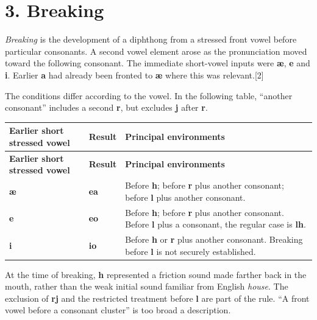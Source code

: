 \section*{3. Breaking}
\emph{Breaking} is the development of a diphthong from a stressed front vowel before particular consonants. A second vowel element arose as the pronunciation moved toward the following consonant. The immediate short-vowel inputs were \textbf{æ}, \textbf{e} and \textbf{i}. Earlier \textbf{a} had already been fronted to \textbf{æ} where this was relevant.[2]\par
The conditions differ according to the vowel. In the following table, “another consonant” includes a second \textbf{r}, but excludes \textbf{j} after \textbf{r}.\par
\begingroup
\fontsize{10.5}{13.2}\selectfont
\setlength{\LTleft}{0pt}
\setlength{\LTright}{0pt plus 1fil}
\begin{longtable}{@{}>{\raggedright\arraybackslash}p{}>{\raggedright\arraybackslash}p{}>{\raggedright\arraybackslash}p{}@{}}
\toprule
\textbf{Earlier short stressed vowel} & \textbf{Result} & \textbf{Principal environments} \\
\midrule
\endfirsthead
\toprule
\textbf{Earlier short stressed vowel} & \textbf{Result} & \textbf{Principal environments} \\
\midrule
\endhead
\bottomrule
\endfoot
\bottomrule
\endlastfoot
\textbf{æ} & \textbf{ea} & Before \textbf{h}; before \textbf{r} plus another consonant; before \textbf{l} plus another consonant. \\
\textbf{e} & \textbf{eo} & Before \textbf{h}; before \textbf{r} plus another consonant. Before \textbf{l} plus a consonant, the regular case is \textbf{lh}. \\
\textbf{i} & \textbf{io} & Before \textbf{h} or \textbf{r} plus another consonant. Breaking before \textbf{l} is not securely established. \\
\end{longtable}
\endgroup
At the time of breaking, \textbf{h} represented a friction sound made farther back in the mouth, rather than the weak initial sound familiar from English \emph{house}. The exclusion of \textbf{rj} and the restricted treatment before \textbf{l} are part of the rule. “A front vowel before a consonant cluster” is too broad a description.\par
